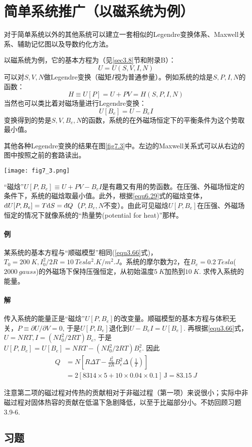 \section{简单系统推广（以磁系统为例）}
\label{sec7.5}
对于简单系统以外的其他系统可以建立一套相似的Legendre变换体系、Maxwell关系、辅助记忆图以及导数约化方法。

以磁系统为例，它的基本方程为（见\ref{sec3.8}节和附录B）：
\begin{equation}
	U = U(S, V, I, N)
\label{equ7.52}
\end{equation}
可以对$S, V, N$做Legendre变换（磁矩$I$视为普通参量）。例如系统的焓是$S, P, I, N$的函数：
\begin{equation}
	H \equiv U[P] = U + PV = H(S, P, I, N)
\label{equ7.53}
\end{equation}
当然也可以类比着对磁场量进行Legendre变换：
\begin{equation}
	U[B_e] = U - B_e I 
\label{equ7.54}
\end{equation}
变换得到的势是$S, V, B_e, N$的函数，系统的在外磁场恒定下的平衡条件为这个势取最小值。

其他各种Legendre变换的结果在图\ref{fig7.3}中。左边的Maxwell关系式可以从右边的图中按照之前的套路读出。

{
	\centering
	\texttt{[image: fig7\_3.png]}
	\figcaption{}
	\label{fig7.3}
}

“磁焓”$U[P, B_e] \equiv U + PV - B_e I$是有趣又有用的势函数。在压强、外磁场恒定的条件下，系统的磁焓取最小值。此外，根据\eqref{equ6.29}式的磁焓变体，$\mathrm{d} U[P, B_e] = T\mathrm{d} S = \mathrm d\hspace*{-0.1em}\bar{}\hspace*{0.08em} Q$（$P, B_e, N$不变）。由此可见磁焓$U[P, B_e]$在压强、外磁场恒定的情况下就像系统的“热量势(potential for heat)”那样。

\paragraph{例} 某系统的基本方程与“顺磁模型”相同(\eqref{equ3.66}式)，$T_0 = \SI{200}{K}, I_0^2 / 2R = \SI{10}{Tesla^2.K\per m^2.J}$。系统的摩尔数为$2$，在$B_e = \SI{0.2}{Tesla}$($\SI{2000}{gauss}$)的外磁场下保持压强恒定，从初始温度$\SI{5}{K}$加热到$\SI{10}{K}$. 求传入系统的能量。

\paragraph{解} 传入系统的能量正是“磁焓”$U[P, B_e]$的改变量。顺磁模型的基本方程与体积无关，$P \equiv \partial U / \partial V = 0$, 于是$U[P, B_e]$退化到$U - B_e I = U[B_e]$. 再根据\eqref{equ3.66}式，$U = NRT, I = (NI_0^2 / 2RT) B_e$, 于是$U[P, B_e] = U[B_e] = NRT - (NI_0^2 / 2RT) B_e^2$. 因此 
\begin{align*}
	Q &= N \left[ R\Delta T - \frac{I_0^2}{2R} B_e^2 \Delta \left( \frac{1}{T} \right) \right] \\
	&= 2 [8314 \times 5 + 10 \times 0.04 \times 0.1] \,\mathrm{J} = \SI{83.15}{J}
\end{align*}

注意第二项的磁过程对传热的贡献相对于非磁过程（第一项）来说很小；实际中非磁过程对固体热容的贡献在低温下急剧降低，以至于比磁部分小。不妨回顾习题3.9-6.

\subsection*{习题}
